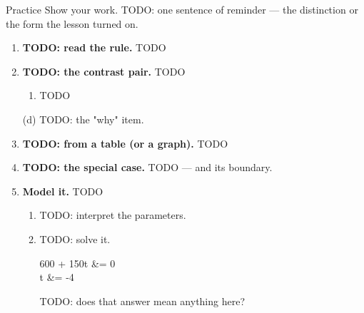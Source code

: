 \documentclass[10pt]{article}
\begin{document}

\vspace{0.10in}

\begin{notesbox}{Practice}
Show your work. TODO: one sentence of reminder --- the distinction or the form the lesson turned on.

\begin{enumerate}[leftmargin=1.9em, itemsep=11pt]
  \item \textbf{TODO: read the rule.} TODO \blank{1.8cm}

  \boxguard[16]
  \item \textbf{TODO: the contrast pair.} TODO
    \begin{enumerate}[label=(\alph*), leftmargin=1.9em, itemsep=4pt]
      \item TODO \blank{1.4cm}
    \end{enumerate}
    (d) TODO: the "why" item. 

  \item \textbf{TODO: from a table (or a graph).} TODO

  \boxguard[16]
  \item \textbf{TODO: the special case.} TODO --- and its boundary.

  \boxguard[20]
  \item \textbf{Model it.} TODO
    \begin{enumerate}[label=(\alph*), leftmargin=1.9em, itemsep=4pt]
      \item TODO: interpret the parameters. \blank{4.0cm}
      \item TODO: solve it.
        \begin{work}
          600 + 150t &= 0 \\
                   t &= -4
        \end{work}
        TODO: does that answer mean anything here? 
    \end{enumerate}


\end{enumerate}
\end{notesbox}
\end{document}
